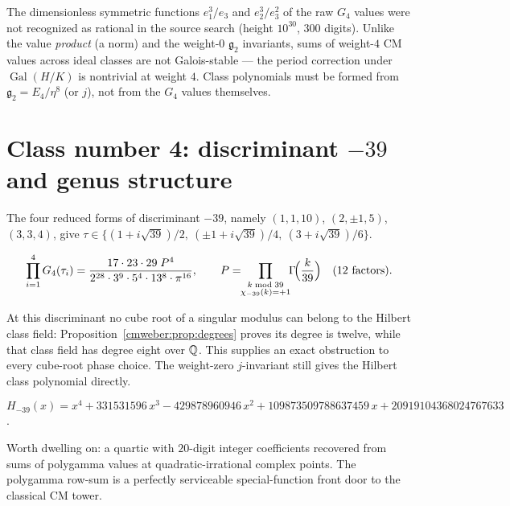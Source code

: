 \begin{negative}\label{cm:neg:sums}
The dimensionless symmetric functions $e_1^3/e_3$ and $e_2^3/e_3^2$ of the raw $G_4$ values
were not recognized as rational in the source search (height $10^{30}$, $300$ digits). Unlike the value
\emph{product} (a norm) and the weight-$0$ $\mathfrak{g}_2$ invariants, sums of weight-$4$ CM
values across ideal classes are not Galois-stable --- the period correction under
$\operatorname{Gal}(H/K)$ is nontrivial at weight $4$. Class polynomials must be formed from
$\mathfrak{g}_2=E_4/\eta^8$ (or $j$), not from the $G_4$ values themselves.
\end{negative}

\section{Class number 4: discriminant \texorpdfstring{$-39$}{-39} and genus structure}
\label{cm:sec:h4}

The four reduced forms of discriminant $-39$, namely $(1,1,10)$, $(2,\pm1,5)$, $(3,3,4)$,
give $\tau\in\{(1+i\sqrt{39})/2,\ (\pm1+i\sqrt{39})/4,\ (3+i\sqrt{39})/6\}$.

\begin{theorem}\label{cm:res:d39}
\[
\prod_{i=1}^{4}G_4(\tau_i)
=\frac{17\cdot23\cdot29\;P^4}{2^{28}\cdot3^{9}\cdot5^{4}\cdot13^{8}\cdot\pi^{16}},\qquad
P=\!\!\prod_{\substack{k\bmod 39\\ \chi_{-39}(k)=+1}}\!\!\Gamma\!\Bigl(\frac{k}{39}\Bigr)
\quad\text{(12 factors)}.
\]
\end{theorem}

At this discriminant no cube root of a singular modulus can belong to the
Hilbert class field: Proposition~\ref{cmweber:prop:degrees} proves its degree
is twelve, while that class field has degree eight over $\mathbb{Q}$. This supplies
an exact obstruction to every cube-root phase choice. The weight-zero
$j$-invariant still gives the Hilbert class polynomial directly.

\begin{theorem}\label{cm:res:H39}
\[
H_{-39}(x)=x^4+331531596\,x^3-429878960946\,x^2+109873509788637459\,x
+20919104368024767633
\]
.
\end{theorem}

Worth dwelling on: a quartic with $20$-digit integer coefficients recovered from sums of
polygamma values at quadratic-irrational complex points. The polygamma row-sum is a
perfectly serviceable special-function front door to the classical CM tower.

